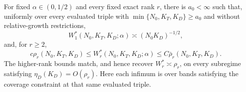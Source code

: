 For fixed \(\alpha\in(0,1/2)\) and every fixed exact rank \(r\), there is \(a_0<\infty\) such that, uniformly over every evaluated triple with \(\min\{N_0,K_T,K_D\}\ge a_0\) and without relative-growth restrictions,
\[
 W_1^*(N_0,K_T,K_D;\alpha)\asymp(N_0K_D)^{-1/2},
\]
and, for \(r\ge2\),
\[
 c\rho_r(N_0,K_T,K_D)
 \le W_r^*(N_0,K_T,K_D;\alpha)
 \le C\bar\rho_r(N_0,K_T,K_D).
\]
The higher-rank bounds match, and hence recover \(W_r^*\asymp\rho_r\), on every subregime satisfying \(\eta_D(K_D)=O(\rho_r)\).  Here each infimum is over bands satisfying the coverage constraint at that same evaluated triple.